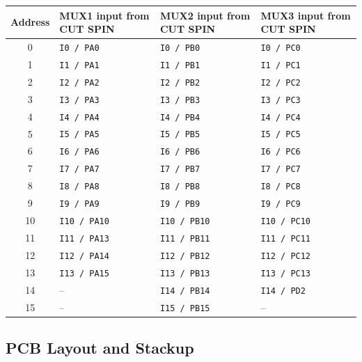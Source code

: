 \begin{center}
\label{tab:gpio_mux_mapping}
\begin{tabular}{|c|p{3.9cm}|p{3.9cm}|p{3.9cm}|}
\hline
\textbf{Address} &
\textbf{MUX1 input from CUT SPIN} &
\textbf{MUX2 input from CUT SPIN} &
\textbf{MUX3 input from CUT SPIN} \\ \hline
0  & \texttt{I0 / PA0}   & \texttt{I0 / PB0}   & \texttt{I0 / PC0} \\ \hline
1  & \texttt{I1 / PA1}   & \texttt{I1 / PB1}   & \texttt{I1 / PC1} \\ \hline
2  & \texttt{I2 / PA2}   & \texttt{I2 / PB2}   & \texttt{I2 / PC2} \\ \hline
3  & \texttt{I3 / PA3}   & \texttt{I3 / PB3}   & \texttt{I3 / PC3} \\ \hline
4  & \texttt{I4 / PA4}   & \texttt{I4 / PB4}   & \texttt{I4 / PC4} \\ \hline
5  & \texttt{I5 / PA5}   & \texttt{I5 / PB5}   & \texttt{I5 / PC5} \\ \hline
6  & \texttt{I6 / PA6}   & \texttt{I6 / PB6}   & \texttt{I6 / PC6} \\ \hline
7  & \texttt{I7 / PA7}   & \texttt{I7 / PB7}   & \texttt{I7 / PC7} \\ \hline
8  & \texttt{I8 / PA8}   & \texttt{I8 / PB8}   & \texttt{I8 / PC8} \\ \hline
9  & \texttt{I9 / PA9}   & \texttt{I9 / PB9}   & \texttt{I9 / PC9} \\ \hline
10 & \texttt{I10 / PA10} & \texttt{I10 / PB10} & \texttt{I10 / PC10} \\ \hline
11 & \texttt{I11 / PA13} & \texttt{I11 / PB11} & \texttt{I11 / PC11} \\ \hline
12 & \texttt{I12 / PA14} & \texttt{I12 / PB12} & \texttt{I12 / PC12} \\ \hline
13 & \texttt{I13 / PA15} & \texttt{I13 / PB13} & \texttt{I13 / PC13} \\ \hline
14 & --                  & \texttt{I14 / PB14} & \texttt{I14 / PD2} \\ \hline
15 & --                  & \texttt{I15 / PB15} & -- \\ \hline
\end{tabular}
\end{center}

\endgroup

\clearpage

\subsection{PCB Layout and Stackup}\label{pcb-layout-and-stackup}

